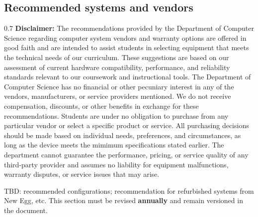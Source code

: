 \newpage\subsection*{Recommended systems and vendors}
\begin{spacing}{0.7}
{\small
\textbf{Disclaimer:} The recommendations provided by the Department of Computer Science regarding computer system vendors and warranty options are offered in good faith and are intended to assist students in selecting equipment that meets the technical needs of our curriculum. These suggestions are based on our assessment of current hardware compatibility, performance, and reliability standards relevant to our coursework and instructional tools. The Department of Computer Science has no financial or other pecuniary interest in any of the vendors, manufacturers, or service providers mentioned. We do not receive compensation, discounts, or other benefits in exchange for these recommendations. Students are under no obligation to purchase from any particular vendor or select a specific product or service. All purchasing decisions should be made based on individual needs, preferences, and circumstances, as long as the device meets the mimimum specifications stated earlier. The department cannot guarantee the performance, pricing, or service quality of any third-party provider and assumes no liability for equipment malfunctions, warranty disputes, or service issues that may arise.} %
\end{spacing}\vskip 12pt

{\color{brown}TBD: recommended configurations; recommendation for refurbished systems from New Egg, etc. This section must be revised \textbf{annually} and remain versioned in the document.}